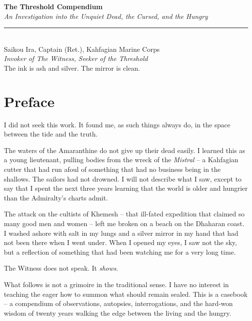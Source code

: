\documentclass[10pt,twoside]{book}
\begin{document}
\begin{titlepage}
\begin{center}
\vspace*{2cm}
{\huge\bfseries\color{witnessSilver} The Threshold Compendium}\\[0.8cm]
{\Large\itshape An Investigation into the Unquiet Dead, the Cursed, and the Hungry}\\[1.5cm]
\rule{0.6\textwidth}{1pt}\\[0.5cm]
{\large Saikou Ira, Captain (Ret.), Kahfagian Marine Corps}\\[0.3cm]
{\em Invoker of The Witness, Seeker of the Threshold}\\[1cm]
\vfill
{\small \textcolor{witnessSilver}{The ink is ash and silver. The mirror is clean.}}
\end{center}
\end{titlepage}

\chapter*{Preface}

I did not seek this work. It found me, as such things always do, in the space between the tide and the truth.

The waters of the Amaranthine do not give up their dead easily. I learned this as a young lieutenant, pulling bodies from the wreck of the \emph{Mistral} -- a Kahfagian cutter that had run afoul of something that had no business being in the shallows. The sailors had not drowned. I will not describe what I saw, except to say that I spent the next three years learning that the world is older and hungrier than the Admiralty's charts admit.

The attack on the cultists of Khemesh -- that ill-fated expedition that claimed so many good men and women -- left me broken on a beach on the Dhaharan coast. I washed ashore with salt in my lungs and a silver mirror in my hand that had not been there when I went under. When I opened my eyes, I saw not the sky, but a reflection of something that had been watching me for a very long time.

The Witness does not speak. It \emph{shows}.

What follows is not a grimoire in the traditional sense. I have no interest in teaching the eager how to summon what should remain sealed. This is a casebook -- a compendium of observations, autopsies, interrogations, and the hard-won wisdom of twenty years walking the edge between the living and the hungry.
\end{document}
